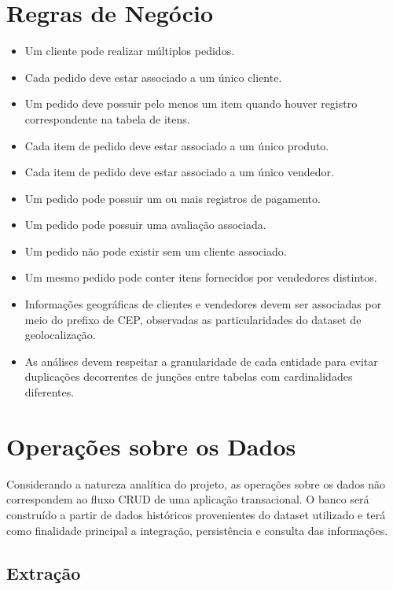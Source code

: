 \documentclass[12pt,a4paper]{article}
\begin{document}
\section{Regras de Negócio}

\begin{itemize}
    \item Um cliente pode realizar múltiplos pedidos.
    \item Cada pedido deve estar associado a um único cliente.
    \item Um pedido deve possuir pelo menos um item quando houver registro correspondente na tabela de itens.
    \item Cada item de pedido deve estar associado a um único produto.
    \item Cada item de pedido deve estar associado a um único vendedor.
    \item Um pedido pode possuir um ou mais registros de pagamento.
    \item Um pedido pode possuir uma avaliação associada.
    \item Um pedido não pode existir sem um cliente associado.
    \item Um mesmo pedido pode conter itens fornecidos por vendedores distintos.
    \item Informações geográficas de clientes e vendedores devem ser associadas por meio do prefixo de CEP, observadas as particularidades do dataset de geolocalização.
    \item As análises devem respeitar a granularidade de cada entidade para evitar duplicações decorrentes de junções entre tabelas com cardinalidades diferentes.
\end{itemize}

\section{Operações sobre os Dados}

Considerando a natureza analítica do projeto, as operações sobre os dados não correspondem ao fluxo CRUD de uma aplicação transacional. O banco será construído a partir de dados históricos provenientes do dataset utilizado e terá como finalidade principal a integração, persistência e consulta das informações.

\subsection{Extração}
\end{document}
